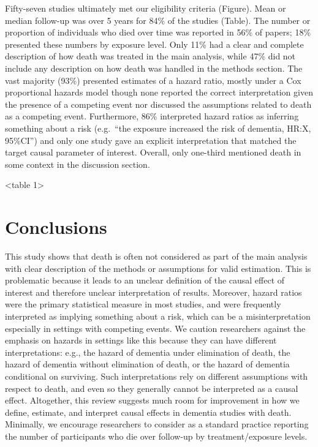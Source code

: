 \documentclass[
]{book}
\begin{document}
Fifty-seven studies ultimately met our eligibility criteria (Figure). Mean or median follow-up was over 5 years for 84\% of the studies (Table). The number or proportion of individuals who died over time was reported in 56\% of papers; 18\% presented these numbers by exposure level. Only 11\% had a clear and complete description of how death was treated in the main analysis, while 47\% did not include any description on how death was handled in the methods section. The vast majority (93\%) presented estimates of a hazard ratio, mostly under a Cox proportional hazards model though none reported the correct interpretation given the presence of a competing event nor discussed the assumptions related to death as a competing event\autocite{young2020,geskus2016,andersen2012}. Furthermore, 86\% interpreted hazard ratios as inferring something about a risk (e.g.~``the exposure increased the risk of dementia, HR:X, 95\%CI'') and only one study gave an explicit interpretation that matched the target causal parameter of interest. Overall, only one-third mentioned death in some context in the discussion section.

\textless table 1\textgreater{}

\hypertarget{conclusions}{%
\section{Conclusions}\label{conclusions}}

This study shows that death is often not considered as part of the main analysis with clear description of the methods or assumptions for valid estimation. This is problematic because it leads to an unclear definition of the causal effect of interest and therefore unclear interpretation of results. Moreover, hazard ratios were the primary statistical measure in most studies, and were frequently interpreted as implying something about a risk, which can be a misinterpretation especially in settings with competing events\autocite{geskus2016}. We caution researchers against the emphasis on hazards in settings like this because they can have different interpretations: e.g., the hazard of dementia under elimination of death, the hazard of dementia without elimination of death, or the hazard of dementia conditional on surviving\autocite{young2020,geskus2016}. Such interpretations rely on different assumptions with respect to death, and even so they generally cannot be interpreted as a causal effect\autocite{young2020,hernan2010,stensrud2020,geskus2016}. Altogether, this review suggests much room for improvement in how we define, estimate, and interpret causal effects in dementia studies with death. Minimally, we encourage researchers to consider as a standard practice reporting the number of participants who die over follow-up by treatment/exposure levels.
\end{document}
